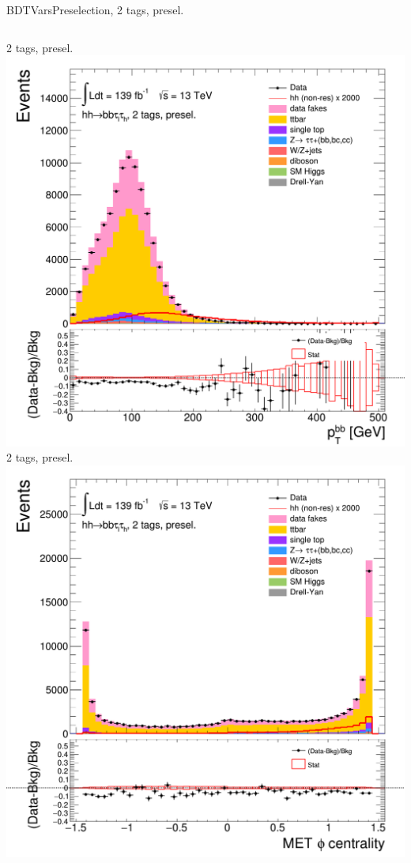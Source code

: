 \begin{frame}{BDTVarsPreselection, 2 tags, presel.}
\begin{columns}[c]
    2 tags, presel.
    \centering\includegraphics[width=\textwidth]{C_2tag2pjet_0ptv_pTBB}\\
    2 tags, presel.
    \centering\includegraphics[width=\textwidth]{C_2tag2pjet_0ptv_METCent}\\

\end{columns}
\end{frame}
